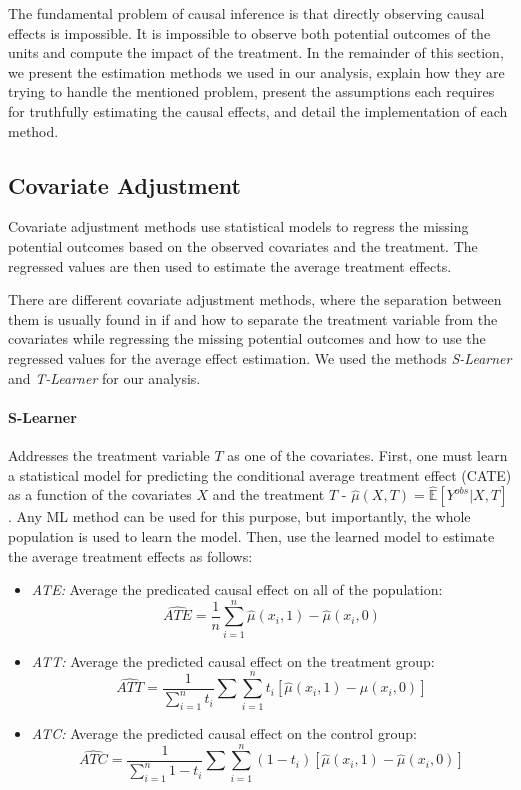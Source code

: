 \documentclass{article}
\newcommand{\gur}[1]{{\color{teal}{Gur: #1}}}
\begin{document}
\gur{For the doubly robust, use the paper I put in the references and cite it for all three.}

The fundamental problem of causal inference is that directly observing causal effects is impossible. It is impossible to observe both potential outcomes of the units and compute the impact of the treatment. In the remainder of this section, we present the estimation methods we used in our analysis, explain how they are trying to handle the mentioned problem, present the assumptions each requires for truthfully estimating the causal effects, and detail the implementation of each method.


\subsection{Covariate Adjustment}

Covariate adjustment methods use statistical models to regress the missing potential outcomes based on the observed covariates and the treatment. The regressed values are then used to estimate the average treatment effects.

There are different covariate adjustment methods, where the separation between them is usually found in if and how to separate the treatment variable from the covariates while regressing the missing potential outcomes and how to use the regressed values for the average effect estimation. We used the methods \emph{S-Learner} and \emph{T-Learner} for our analysis.

\gur{Theoretical guarantees?}

\paragraph{S-Learner} Addresses the treatment variable $T$ as one of the covariates. First, one must learn a statistical model for predicting the conditional average treatment effect (CATE) as a function of the covariates $X$ and the treatment $T$ - $\hat{\mu}(X, T) = \hat{\mathbb{E}}[Y^{obs} | X, T]$. Any ML method can be used for this purpose, but importantly, the whole population is used to learn the model. Then, use the learned model to estimate the average treatment effects as follows:

\begin{itemize}
    \item \textit{ATE:} Average the predicated causal effect on all of the population:
    \[
    \widehat{ATE} = \frac{1}{n} \sum_{i=1}^{n} \hat{\mu}(x_i, 1) - \hat{\mu}(x_i, 0)
    \]
    \item \textit{ATT:} Average the predicted causal effect on the treatment group:
    \[
    \widehat{ATT} = \frac{1}{\sum_{i=1}^{n} t_i} \sum \sum_{i=1}^{n} t_i \left[ \hat{\mu}(x_i, 1) - \hat{\mu}(x_i, 0) \right] 
    \]
    \item \textit{ATC:} Average the predicted causal effect on the control group:
    \[
    \widehat{ATC} = \frac{1}{\sum_{i=1}^{n} 1 - t_i} \sum \sum_{i=1}^{n} (1 - t_i) \left[ \hat{\mu}(x_i, 1) - \hat{\mu}(x_i, 0) \right]
    \]
\end{itemize}
\end{document}
